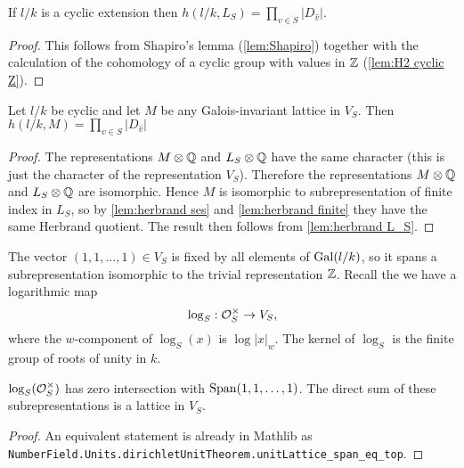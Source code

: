 \begin{lemma} \label{lem:herbrand L_S}
	If $l/k$ is a cyclic extension then
	$h(l/k,L_S) = \prod_{v \in S} |D_{\hat v}|$.
\end{lemma}

\begin{proof}
	This follows from Shapiro's lemma (\ref{lem:Shapiro})
	together with the calculation
	of the cohomology of a cyclic group with values in ${\mathbb Z}$ (\ref{lem:H2 cyclic Z}).
\end{proof}

\begin{lemma} \label{lem:herbrand log lattice}
	Let $l/k$ be cyclic and let $M$ be any Galois-invariant lattice in $V_S$.
	Then $h(l/k,M) = \prod_{v \in S} |D_{\hat v}|$
\end{lemma}

\begin{proof}
	The representations $M \otimes {\mathbb Q}$ and $L_S \otimes {\mathbb Q}$ have the same character
	(this is just the character of the representation $V_S$).
	Therefore the representations $M \otimes {\mathbb Q}$ and $L_S \otimes {\mathbb Q}$ are isomorphic.
	Hence $M$ is isomorphic to subrepresentation of finite index in $L_S$,
	so by \ref{lem:herbrand ses} and \ref{lem:herbrand finite}
	they have the same Herbrand quotient.
	The result then follows from \ref{lem:herbrand L_S}.
\end{proof}


The vector $(1,1,\ldots,1) \in V_S$ is fixed by all elements of $\mathrm{Gal}(l/k)$, so it spans
a subrepresentation isomorphic to the trivial representation ${\mathbb Z}$.
Recall the we have a logarithmic map
\[
	\log_S : {\mathcal O}_S^\times \to V_S,
\]
where the $w$-component of $\log_S(x)$ is $\log |x|_w$.
The kernel of $\log_S$ is the finite group of roots of unity in $k$.

\begin{theorem} \label{thm:Dirichlet unit theorem}
	\mathlibok
	$\log_S({\mathcal O}_S^\times)$ has zero intersection with $\mathrm{Span} (1,1,\ldots,1)$.
	The direct sum of these subrepresentations is a lattice in $V_S$.
\end{theorem}

\begin{proof}
	\mathlibok
	An equivalent statement is already in Mathlib as
	\texttt{NumberField.Units.dirichletUnitTheorem.unitLattice\_span\_eq\_top}.
\end{proof}

